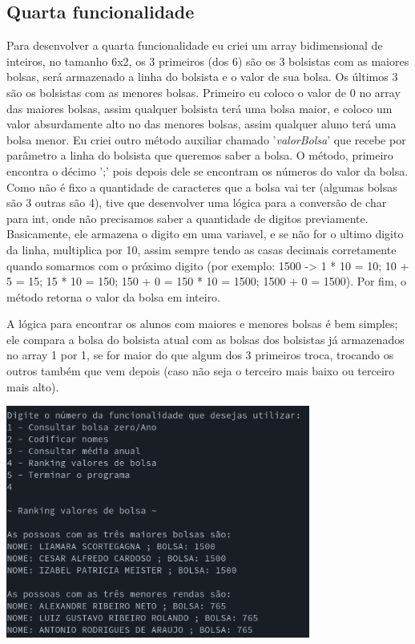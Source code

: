 \documentclass[11pt]{article}
\begin{document}
\subsection{Quarta funcionalidade}
\label{sec:orgfca00f7}
Para desenvolver a quarta funcionalidade eu criei um array bidimensional de inteiros, no tamanho 6x2, os 3 primeiros (dos 6) são os 3 bolsistas com as maiores bolsas, será armazenado a linha do bolsista e o valor de sua bolsa. Os últimos 3 são os bolsistas com as menores bolsas.
Primeiro eu coloco o valor de 0 no array das maiores bolsas, assim qualquer bolsista terá uma bolsa maior, e coloco um valor absurdamente alto no das menores bolsas, assim qualquer aluno terá uma bolsa menor.
Eu criei outro método auxiliar chamado '\emph{valorBolsa}' que recebe por parâmetro a linha do bolsista que queremos saber a bolsa. O método, primeiro encontra o décimo ';' pois depois dele se encontram os números do valor da bolsa. Como não é fixo a quantidade de caracteres que a bolsa vai ter (algumas bolsas são 3 outras são 4), tive que desenvolver uma lógica para a conversão de char para int, onde não precisamos saber a quantidade de digitos previamente. Basicamente, ele armazena o digito em uma variavel, e se não for o ultimo digito da linha, multiplica por 10, assim sempre tendo as casas decimais corretamente quando somarmos com o próximo digito (por exemplo: 1500 -> 1 * 10 = 10; 10 + 5 = 15; 15 * 10 = 150; 150 + 0 = 150 * 10 = 1500; 1500 + 0 = 1500). Por fim, o método retorna o valor da bolsa em inteiro.

A lógica para encontrar os alunos com maiores e menores bolsas é bem simples; ele compara a bolsa do bolsista atual com as bolsas dos bolsistas já armazenados no array 1 por 1, se for maior do que algum dos 3 primeiros troca, trocando os outros também que vem depois (caso não seja o terceiro mais baixo ou terceiro mais alto).

\includegraphics[width=10cm]{func4.png}
\end{document}
